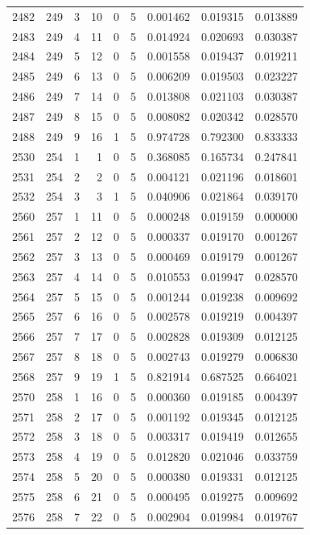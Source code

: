 \begin{longtable}{rrrrrrrrr}
2482 & 249 & 3 & 10 & 0 & 5 & 0.001462 & 0.019315 & 0.013889 \\
2483 & 249 & 4 & 11 & 0 & 5 & 0.014924 & 0.020693 & 0.030387 \\
2484 & 249 & 5 & 12 & 0 & 5 & 0.001558 & 0.019437 & 0.019211 \\
2485 & 249 & 6 & 13 & 0 & 5 & 0.006209 & 0.019503 & 0.023227 \\
2486 & 249 & 7 & 14 & 0 & 5 & 0.013808 & 0.021103 & 0.030387 \\
2487 & 249 & 8 & 15 & 0 & 5 & 0.008082 & 0.020342 & 0.028570 \\
2488 & 249 & 9 & 16 & 1 & 5 & 0.974728 & 0.792300 & 0.833333 \\
2530 & 254 & 1 & 1 & 0 & 5 & 0.368085 & 0.165734 & 0.247841 \\
2531 & 254 & 2 & 2 & 0 & 5 & 0.004121 & 0.021196 & 0.018601 \\
2532 & 254 & 3 & 3 & 1 & 5 & 0.040906 & 0.021864 & 0.039170 \\
2560 & 257 & 1 & 11 & 0 & 5 & 0.000248 & 0.019159 & 0.000000 \\
2561 & 257 & 2 & 12 & 0 & 5 & 0.000337 & 0.019170 & 0.001267 \\
2562 & 257 & 3 & 13 & 0 & 5 & 0.000469 & 0.019179 & 0.001267 \\
2563 & 257 & 4 & 14 & 0 & 5 & 0.010553 & 0.019947 & 0.028570 \\
2564 & 257 & 5 & 15 & 0 & 5 & 0.001244 & 0.019238 & 0.009692 \\
2565 & 257 & 6 & 16 & 0 & 5 & 0.002578 & 0.019219 & 0.004397 \\
2566 & 257 & 7 & 17 & 0 & 5 & 0.002828 & 0.019309 & 0.012125 \\
2567 & 257 & 8 & 18 & 0 & 5 & 0.002743 & 0.019279 & 0.006830 \\
2568 & 257 & 9 & 19 & 1 & 5 & 0.821914 & 0.687525 & 0.664021 \\
2570 & 258 & 1 & 16 & 0 & 5 & 0.000360 & 0.019185 & 0.004397 \\
2571 & 258 & 2 & 17 & 0 & 5 & 0.001192 & 0.019345 & 0.012125 \\
2572 & 258 & 3 & 18 & 0 & 5 & 0.003317 & 0.019419 & 0.012655 \\
2573 & 258 & 4 & 19 & 0 & 5 & 0.012820 & 0.021046 & 0.033759 \\
2574 & 258 & 5 & 20 & 0 & 5 & 0.000380 & 0.019331 & 0.012125 \\
2575 & 258 & 6 & 21 & 0 & 5 & 0.000495 & 0.019275 & 0.009692 \\
2576 & 258 & 7 & 22 & 0 & 5 & 0.002904 & 0.019984 & 0.019767 \\

\end{longtable}
